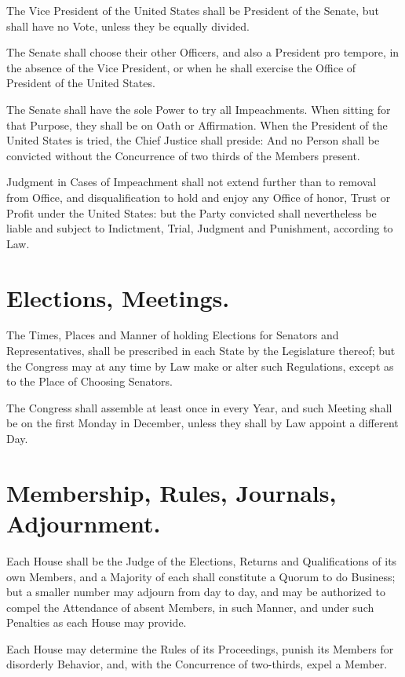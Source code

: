 \documentclass[12pt]{constitution}
\begin{document}
The Vice President of the United States shall be President of the Senate, but
shall have no Vote, unless they be equally divided.

The Senate shall choose their other Officers, and also a President pro tempore,
in the absence of the Vice President, or when he shall exercise the Office of
President of the United States.

The Senate shall have the sole Power to try all Impeachments. When sitting for
that Purpose, they shall be on Oath or Affirmation. When the President of the
United States is tried, the Chief Justice shall preside: And no Person shall be
convicted without the Concurrence of two thirds of the Members present.

Judgment in Cases of Impeachment shall not extend further than to removal from
Office, and disqualification to hold and enjoy any Office of honor, Trust or
Profit under the United States: but the Party convicted shall nevertheless be
liable and subject to Indictment, Trial, Judgment and Punishment, according to
Law.


\section{Elections, Meetings.}
The Times, Places and Manner of holding Elections for Senators and
Representatives, shall be prescribed in each State by the Legislature thereof;
but the Congress may at any time by Law make or alter such Regulations, except
as to the Place of Choosing Senators.

The Congress shall assemble at least once in every Year, and such Meeting shall
be on the first Monday in December, unless they shall by Law appoint a
different Day.


\section{Membership, Rules, Journals, Adjournment.}
Each House shall be the Judge of the Elections, Returns and Qualifications of
its own Members, and a Majority of each shall constitute a Quorum to do
Business; but a smaller number may adjourn from day to day, and may be
authorized to compel the Attendance of absent Members, in such Manner, and
under such Penalties as each House may provide.

Each House may determine the Rules of its Proceedings, punish its Members for
disorderly Behavior, and, with the Concurrence of two-thirds, expel a Member.
\end{document}
